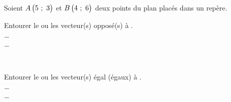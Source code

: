 \documentclass[a4paper,10pt,twocolumn,landscape]{article}
\begin{document}
\pagestyle{premierepage}	%

Soient $A\begin{pmatrix}5~;~3\end{pmatrix}$ et $B\begin{pmatrix}4~;~6\end{pmatrix}$ deux points du plan placés dans un repère.

\question Entourer le ou les vecteur(s) opposé(s) à .\\[1em]
\begin{inparaenum}[~]
	\item {}
	\item $-$
	\item $-$
	\item {}~
\end{inparaenum}%
\question Entourer le ou les vecteur(s) égal (égaux) à .\\[1em]
\begin{inparaenum}[~]
	\item {}
	\item $-$
	\item $-$
	\item {}~
\end{inparaenum}%

\newpage
\end{document}

